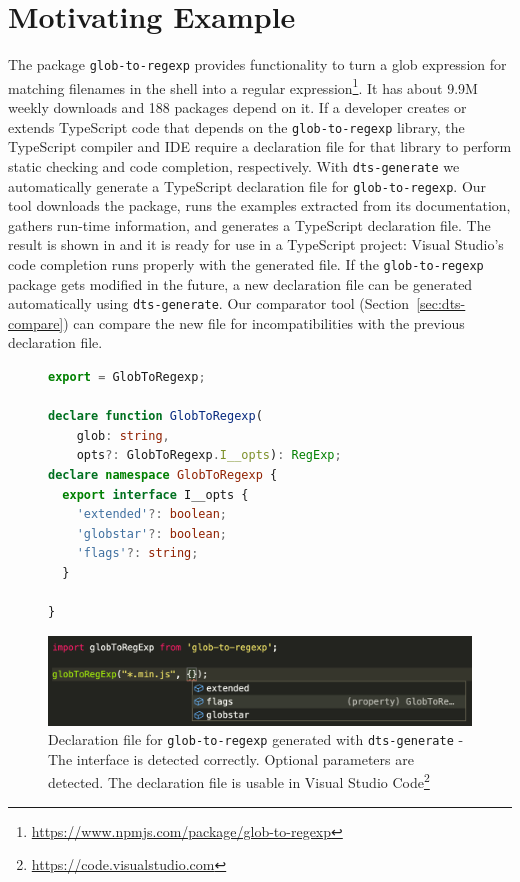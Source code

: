 \documentclass[sigconf]{acmart}
\begin{document}
\section{Motivating Example}
\label{sec:motivating-example}
The \NPM{} package \texttt{glob-to-regexp} provides functionality to turn a
glob expression for matching filenames in the shell into a regular
expression\footnote{\url{https://www.npmjs.com/package/glob-to-regexp}}. It 
has about 9.9M weekly downloads and 188 \NPM{} packages depend on it. If
a developer creates or extends TypeScript code that depends on the
\texttt{glob-to-regexp} library, the TypeScript
compiler and IDE require a declaration file for that library to
perform static checking and code completion, respectively. With
\texttt{dts-generate} we automatically generate a TypeScript
declaration file for \texttt{glob-to-regexp}. Our tool downloads the \NPM{} 
package, runs the examples extracted from its documentation, gathers
run-time information, and generates a TypeScript declaration
file. The result is 
shown in  and it is
ready for use in a TypeScript project:  Visual Studio's
code completion runs properly with the generated file. If the
\texttt{glob-to-regexp} package gets modified in the future, a new declaration
file can be generated automatically using
\texttt{dts-generate}. Our comparator tool (Section~\ref{sec:dts-compare}) can compare the new file
for incompatibilities with the previous declaration file.

\begin{figure}[tp]
  \centering
    \begin{lstlisting}[language=TypeScript,numbers=none]
export = GlobToRegexp;

declare function GlobToRegexp(
    glob: string, 
    opts?: GlobToRegexp.I__opts): RegExp;
declare namespace GlobToRegexp {
  export interface I__opts {
    'extended'?: boolean;
    'globstar'?: boolean;
    'flags'?: string;
  }

}
    \end{lstlisting}
  \begin{center}
    \includegraphics[width=\linewidth]{motivating-example-glob-to-regexp-vscode.png}
  \end{center}

  \caption{Declaration file for \texttt{glob-to-regexp} 
    generated with \texttt{dts-generate} - The interface is
    detected correctly. Optional parameters are detected. The declaration 
    file is usable in Visual Studio Code\protect\footnote{\url{https://code.visualstudio.com}}} 
  \label{fig:motivating-example-glob-to-regexp-vscode}
\end{figure}
\end{document}
